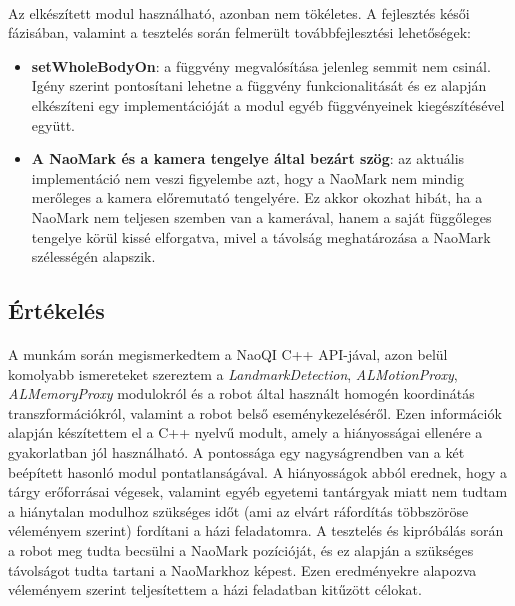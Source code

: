 \documentclass{article}
\numberwithin{figure}{section}
\newenvironment{compactlist}
{ \begin{itemize}
    \setlength{\itemsep}{0pt}
    \setlength{\parskip}{0pt}
    \setlength{\parsep}{0pt}
	\setlength{\topsep}{0pt}
}
{ \end{itemize}}
\begin{document}
\begin{sloppypar}
	\paragraph{}
	Az elkészített modul használható, azonban nem tökéletes. A fejlesztés késői fázisában, valamint a tesztelés során felmerült továbbfejlesztési lehetőségek:
	\begin{compactlist}
		\item \textbf{setWholeBodyOn}: a függvény megvalósítása jelenleg semmit nem csinál. Igény szerint pontosítani lehetne a függvény funkcionalitását és ez alapján elkészíteni egy implementációját a modul egyéb függvényeinek kiegészítésével együtt.
		\item \textbf{A NaoMark és a kamera tengelye által bezárt szög}: az aktuális implementáció nem veszi figyelembe azt, hogy a NaoMark nem mindig merőleges a kamera előremutató tengelyére. Ez akkor okozhat hibát, ha a NaoMark nem teljesen szemben van a kamerával, hanem a saját függőleges tengelye körül kissé elforgatva, mivel a távolság meghatározása a NaoMark szélességén alapszik.
	\end{compactlist}
	\subsection{Értékelés}
	\paragraph{}
	A munkám során megismerkedtem a NaoQI C++ API-jával, azon belül komolyabb ismereteket szereztem a \textit{LandmarkDetection}, \textit{ALMotionProxy}, \textit{ALMemoryProxy} modulokról és a robot által használt homogén koordinátás transzformációkról, valamint a robot belső eseménykezeléséről. Ezen információk alapján készítettem el a C++ nyelvű modult, amely a hiányosságai ellenére a gyakorlatban jól használható. A pontossága egy nagyságrendben van a két beépített hasonló modul pontatlanságával. A hiányosságok abból erednek, hogy a tárgy erőforrásai végesek, valamint egyéb egyetemi tantárgyak miatt nem tudtam a hiánytalan modulhoz szükséges időt (ami az elvárt ráfordítás többszöröse véleményem szerint) fordítani a házi feladatomra. A tesztelés és kipróbálás során a robot meg tudta becsülni a NaoMark pozícióját, és ez alapján a szükséges távolságot tudta tartani a NaoMarkhoz képest. Ezen eredményekre alapozva véleményem szerint teljesítettem a házi feladatban kitűzött célokat.	
		
	\end{sloppypar}
\end{document}
